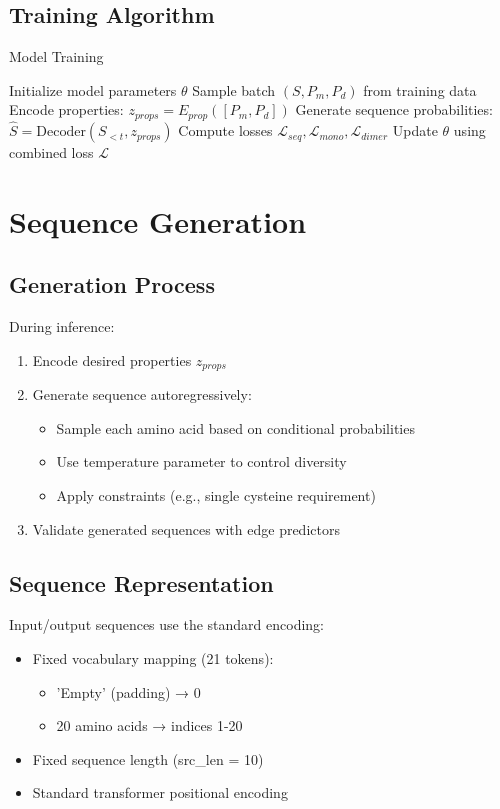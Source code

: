 \documentclass[11pt]{article}
\begin{document}
\subsection{Training Algorithm}
\begin{algorithm}[H]
\caption{Model Training}
\begin{algorithmic}[1]
\STATE Initialize model parameters $\theta$
    \STATE Sample batch $(S, P_m, P_d)$ from training data
    \STATE Encode properties: $z_{props} = E_{prop}([P_m, P_d])$
    \STATE Generate sequence probabilities: $\hat{S} = \text{Decoder}(S_{<t}, z_{props})$
    \STATE Compute losses $\mathcal{L}_{seq}, \mathcal{L}_{mono}, \mathcal{L}_{dimer}$
    \STATE Update $\theta$ using combined loss $\mathcal{L}$
\ENDWHILE
\end{algorithmic}
\end{algorithm}

\section{Sequence Generation}

\subsection{Generation Process}
During inference:
\begin{enumerate}
    \item Encode desired properties $z_{props}$
    \item Generate sequence autoregressively:
        \begin{itemize}
            \item Sample each amino acid based on conditional probabilities
            \item Use temperature parameter to control diversity
            \item Apply constraints (e.g., single cysteine requirement)
        \end{itemize}
    \item Validate generated sequences with edge predictors
\end{enumerate}

\subsection{Sequence Representation}
Input/output sequences use the standard encoding:
\begin{itemize}
    \item Fixed vocabulary mapping (21 tokens):
        \begin{itemize}
            \item 'Empty' (padding) → 0
            \item 20 amino acids → indices 1-20
        \end{itemize}
    \item Fixed sequence length (src\_len = 10)
    \item Standard transformer positional encoding
\end{itemize}
\end{document}
